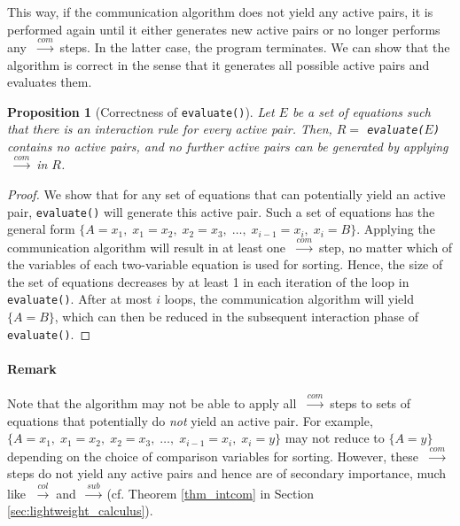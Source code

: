 \documentclass[submission,copyright,creativecommons]{eptcs}
\newcommand{\lwcom}{$\;\stackrel{com}{\longrightarrow}\;$}
\newcommand{\lwcol}{$\;\stackrel{col}{\longrightarrow}\;$}
\newcommand{\lwsub}{$\;\stackrel{sub}{\longrightarrow}\;$}
\begin{document}
This way, if the communication algorithm does not yield any active pairs, it is
performed again until it either generates new active pairs or no longer performs
any \lwcom steps. In the latter case, the program terminates. We can show that
the algorithm is correct in the sense that it generates all possible active
pairs and evaluates them.

\newtheorem{prop:algorithm_correctness}[subsection]{Proposition}

\begin{prop:algorithm_correctness} [Correctness of \texttt{evaluate()}] Let $E$
be a set of equations such that there is an interaction rule for every active
pair. Then, $R=$ \lstinline;evaluate(;$E$\texttt{)} contains no active pairs,
and no further active pairs can be generated by applying \lwcom in $R$.
\end{prop:algorithm_correctness}
\begin{proof}
We show that for any set of equations that can potentially yield an active pair,
\lstinline;evaluate(); will generate this active pair. Such a set of equations
has the general form $\{ A=x_1,\; x_1 = x_2,\; x_2=x_3,\; \ldots,\;
x_{i-1}=x_i,\; x_i=B \}$. Applying the communication algorithm will result in at
least one \lwcom step, no matter which of the variables of each two-variable
equation is used for sorting. Hence, the size of the set of equations decreases
by at least 1 in each iteration of the loop in \lstinline;evaluate();.
After at most $i$ loops, the communication algorithm will yield $\{A=B\}$, which
can then be reduced in the subsequent interaction phase of
\lstinline;evaluate();.
\end{proof}

\paragraph*{\textbf{Remark}}
Note that the algorithm may not be able to apply all \lwcom steps to sets of
equations that potentially do \emph{not} yield an active pair. For example,
$\{ A=x_1,\; x_1 = x_2,\; x_2=x_3,\; \ldots,\; x_{i-1}=x_i,\; x_i=y \}$
may not reduce to $\{A=y\}$ depending on the choice of comparison
variables for sorting. However, these \lwcom steps do not yield any active
pairs and hence are of secondary importance, much like \lwcol and \lwsub (cf. Theorem
\ref{thm_intcom} in Section \ref{sec:lightweight_calculus}).
\end{document}
